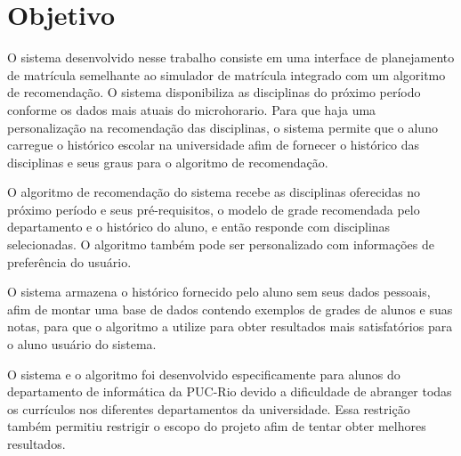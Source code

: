 \chapter{Objetivo}
\label{cha:Objetivo}


O sistema desenvolvido nesse trabalho consiste em uma interface de planejamento de matrícula semelhante ao simulador de matrícula integrado com um algoritmo de recomendação. O sistema disponibiliza as disciplinas do próximo período conforme os dados mais atuais do microhorario. Para que haja uma personalização na recomendação das disciplinas, o sistema permite que o aluno carregue o histórico escolar na universidade afim de fornecer o histórico das disciplinas e seus graus para o algoritmo de recomendação.

O algoritmo de recomendação do sistema recebe as disciplinas oferecidas no próximo período e seus pré-requisitos, o modelo de grade recomendada pelo departamento e o histórico do aluno, e então responde com disciplinas selecionadas. O algoritmo também pode ser personalizado com informações de preferência do usuário.

O sistema armazena o histórico fornecido pelo aluno sem seus dados pessoais, afim de montar uma base de dados contendo exemplos de grades de alunos e suas notas, para que o algoritmo a utilize para obter resultados mais satisfatórios para o aluno usuário do sistema.

O sistema e o algoritmo foi desenvolvido especificamente para alunos do departamento de informática da PUC-Rio devido a dificuldade de abranger todas os currículos nos diferentes departamentos da universidade. Essa restrição também permitiu restrigir o escopo do projeto afim de tentar obter melhores resultados.





